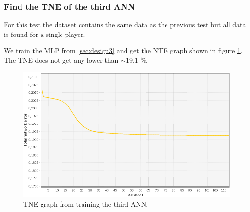\subsubsection{Find the TNE of the third ANN}
\label{sec:ann-test3}
For this test the dataset contains the same data as the previous test but all data is found for a single player.

We train the MLP from \ref{sec:design3} and get the NTE graph shown in figure \ref{fig:tneg3}. The TNE does not get any lower than $\sim$19,1 \%.

\begin{figure}[H]
  \center
    \includegraphics[scale=0.6]{images/nn/default-nn2-err.png}
  \caption{TNE graph from training the third ANN.\label{fig:tneg3}}
\end{figure}

